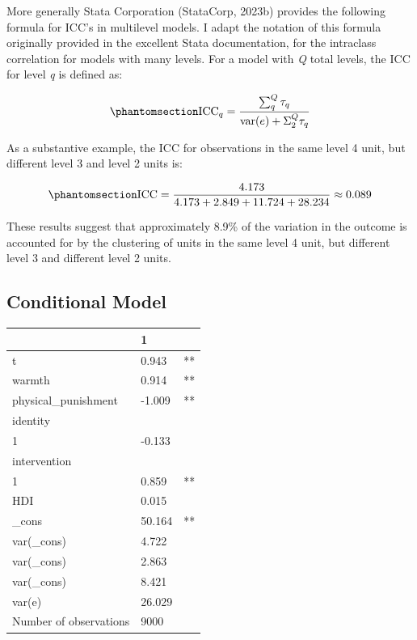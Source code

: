 \documentclass[
  letterpaper,
  DIV=11,
  numbers=noendperiod]{scrreprt}
\begin{document}
More generally Stata Corporation (StataCorp, 2023b) provides the
following formula for ICC's in multilevel models.  I adapt
the notation of this formula originally provided in the excellent Stata
documentation, for the intraclass correlation for models with many
levels. For a model with \emph{Q} total levels, the ICC for level
\emph{q} is defined as:

\begin{equation}\phantomsection\label{eq-ICC-morelevels}{\text{ICC}_q = \frac{\sum^Q_{q} \tau_q}{\text{var}(e) + \Sigma^Q_2 \tau_q}}\end{equation}

As a substantive example, the ICC for observations in the same level 4
unit, but different level 3 and level 2 units is:

\begin{equation}\phantomsection\label{eq-ICC-morelevels-substantive}{\text{ICC} = \frac{4.173}{4.173 + 2.849 + 11.724 + 28.234} \approx 0.089}\end{equation}

These results suggest that approximately 8.9\% of the variation in the
outcome is accounted for by the clustering of units in the same level 4
unit, but different level 3 and different level 2 units.

\subsection{Conditional Model}\label{conditional-model}

\begin{longtable}[]{@{}lll@{}}
\toprule\noalign{}
& 1 & \\
\midrule\noalign{}
\endhead
\bottomrule\noalign{}
\endlastfoot
t & 0.943 & ** \\
warmth & 0.914 & ** \\
physical\_punishment & -1.009 & ** \\
identity & & \\
1 & -0.133 & \\
intervention & & \\
1 & 0.859 & ** \\
HDI & 0.015 & \\
\_cons & 50.164 & ** \\
var(\_cons) & 4.722 & \\
var(\_cons) & 2.863 & \\
var(\_cons) & 8.421 & \\
var(e) & 26.029 & \\
Number of observations & 9000 & \\
\end{longtable}
\end{document}
